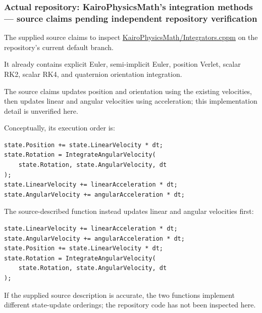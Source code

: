 \subsubsection{Actual repository: KairoPhysicsMath's integration methods --- source claims pending independent repository verification}\label{02-foundations-ii-ch025-actual-repository-kairophysicsmaths-integration-methods-source-claims-pending-independent-repository-verification}

\hypertarget{02-foundations-ii-ch025-actual-repository-kairophysicsmaths-integration-methods-source-claims-pending-independent-repository-verification}{}

The supplied source claims to inspect \href{https://github.com/swayam8624/KairoPhysicsMath/blob/main/Integrators.cppm?utm_source=chatgpt.com}{KairoPhysicsMath/Integrators.cppm} on the repository's current default branch.

It already contains explicit Euler, semi-implicit Euler, position Verlet, scalar RK2, scalar RK4, and quaternion orientation integration.

The source claims  updates position and orientation using the existing velocities, then updates linear and angular velocities using acceleration; this implementation detail is unverified here.

Conceptually, its execution order is:

\begin{verbatim}
state.Position += state.LinearVelocity * dt;
state.Rotation = IntegrateAngularVelocity(
    state.Rotation, state.AngularVelocity, dt
);
state.LinearVelocity += linearAcceleration * dt;
state.AngularVelocity += angularAcceleration * dt;
\end{verbatim}

The source-described  function instead updates linear and angular velocities first:

\begin{verbatim}
state.LinearVelocity += linearAcceleration * dt;
state.AngularVelocity += angularAcceleration * dt;
state.Position += state.LinearVelocity * dt;
state.Rotation = IntegrateAngularVelocity(
    state.Rotation, state.AngularVelocity, dt
);
\end{verbatim}

If the supplied source description is accurate, the two functions implement different state-update orderings; the repository code has not been inspected here.

